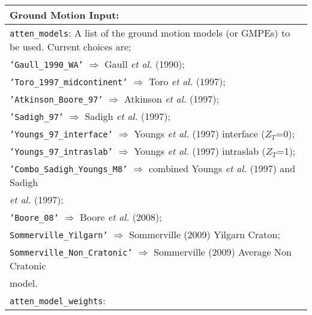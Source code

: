 \documentclass[a4paper, 12pt]{report}
\begin{document}
\vspace{2em}
\begin{tabular}{|p{\textwidth}|}
\hline
\vspace{0.3em} \noindent \Large \textbf{Ground Motion Input:} \normalsize \\
\hline
\vspace{0.1em} \texttt{atten\_models}:
A list of the ground motion models (or GMPEs) to be used. Current choices are; \\
 \hspace{0.5em} \texttt{'Gaull\_1990\_WA'} $\Rightarrow$ Gaull \textit{et al.} (1990); \\
 \hspace{0.5em}  \texttt{'Toro\_1997\_midcontinent'}  $\Rightarrow$ Toro \textit{et al.} (1997); \\
 \hspace{0.5em}  \texttt{'Atkinson\_Boore\_97'}  $\Rightarrow$ Atkinson \textit{et al.} (1997); \\
 \hspace{0.5em}  \texttt{'Sadigh\_97'}  $\Rightarrow$ Sadigh \textit{et al.} (1997); \\
 \hspace{0.5em}  \texttt{'Youngs\_97\_interface'}  $\Rightarrow$ Youngs \textit{et al.} (1997) interface ($Z_T$=0); \\
 \hspace{0.5em}  \texttt{'Youngs\_97\_intraslab'}  $\Rightarrow$ Youngs \textit{et al.} (1997) intraslab ($Z_T$=1); \\
 \hspace{0.5em}  \texttt{'Combo\_Sadigh\_Youngs\_M8'}  $\Rightarrow$ combined Youngs \textit{et al.} (1997) and Sadigh \\
 \hspace{14.5em} \textit{et al.} (1997); \\
 \hspace{0.5em}  \texttt{'Boore\_08'}  $\Rightarrow$ Boore \textit{et al.} (2008); \\
 \hspace{0.5em} \texttt{Sommerville\_Yilgarn'} $\Rightarrow$ Sommerville (2009) Yilgarn Craton; \\
  \hspace{0.5em} \texttt{Sommerville\_Non\_Cratonic'} $\Rightarrow$ Sommerville (2009) Average Non Cratonic \\
  \hspace{14.5em}  model. \\
\hline
\vspace{0.1em} \texttt{atten\_model\_weights}:

\end{tabular}
\end{document}
